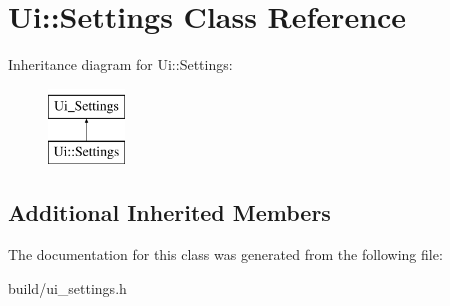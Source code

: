 \hypertarget{class_ui_1_1_settings}{}\section{Ui\+:\+:Settings Class Reference}
\label{class_ui_1_1_settings}
Inheritance diagram for Ui\+:\+:Settings\+:\begin{figure}[H]
\begin{center}
\leavevmode
\includegraphics[height=2.000000cm]{class_ui_1_1_settings}
\end{center}
\end{figure}
\subsection*{Additional Inherited Members}


The documentation for this class was generated from the following file\+:\begin{DoxyCompactItemize}
\item 
build/ui\+\_\+settings.\+h\end{DoxyCompactItemize}
